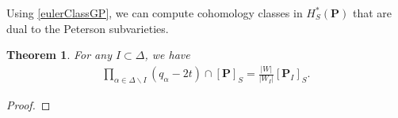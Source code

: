 \documentclass[10pt]{article}
\newtheorem{thm}{Theorem}
\numberwithin{thm}{section}
\newtheorem{prop}[thm]{Proposition}
\theoremstyle{definition}
\theoremstyle{remark}
\newcommand{\Pet}{\ensuremath{\mathbf{P}}}
\newcommand{\Fl}{\ensuremath{G/B}}
\begin{document}
Using \cref{eulerClassGP}, we can compute cohomology classes in $H^*_S(\Pet)$ that are dual to the Peterson subvarieties.
\begin{thm}
\label{qChevalley}
For any $I\subset\Delta$, we have 
\begin{align*}
\prod\limits_{\alpha\in\Delta\backslash I}(q_\alpha-2t)\cap[\Pet]_S=\frac{|W|}{|W_I|}[\Pet_I]_S.
\end{align*}
\end{thm}
\begin{proof}


\end{proof}
\end{document}
